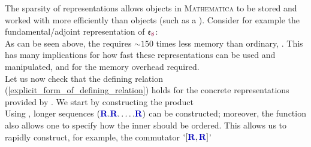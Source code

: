 \documentclass[12pt,a4paper]{article}\let\ifpdf\relax
\begin{document}
The sparsity of representations allows  objects in \textsc{Mathematica} to be stored and worked with more efficiently than  objects (such as a ). Consider for example the fundamental/adjoint representation of $\mathfrak{e}_{\r{8}}$:
%
~\\[-0pt]
%
As can be seen above, the  requires $\sim\!150$ times less memory than ordinary,  . This has many implications for how fast these representations can be used and manipulated, and for the memory overhead required.\\[-10pt]
%







Let us now check that the defining relation (\ref{explicit_form_of_defining_relation}) holds for the concrete representations provided by \rpackage. We start by constructing the  product
%
~\\[0pt]
Using , longer sequences $(\mathbf{\b{R}}.\mathbf{\b{R}}.\ldots.\mathbf{\b{R}})$ can be constructed; moreover, the function  also allows one to specify how the inner   should be ordered. This allows us to rapidly construct, for example, the commutator $`[\mathbf{\b{R}},\mathbf{\b{R}}]$'\\[-16pt]
%
~\\[-16pt]
\end{document}
